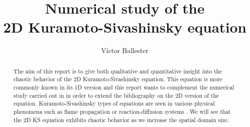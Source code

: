 \documentclass[twoside]{article}
\title{Numerical study of the\\2D Kuramoto-Sivashinsky equation}
\author{Víctor Ballester}
\date{\parbox{\linewidth}{\centering
Instabilities and Nonlinear Phenomena\endgraf
M2 - Applied and Theoretical Mathematics\endgraf
Université Paris-Dauphine, PSL\endgraf
\today}}
\begin{document}
\maketitle
\begin{abstract}
  The aim of this report is to give both qualitative and quantitative insight into the chaotic behavior of the 2D Kuramoto-Sivashinsky equation. This equation is more commonly known in its 1D version and this report wants to complement the numerical study carried out in \cite{Kalogirou2015} in order to extend the bibliography on the 2D version of the equation. Kuramoto-Sivashinsky types of equations are seen in various physical phenomena such as flame propagation or reaction-diffusion systems \cite{Kuramoto,Sivashinsky1977}. We will see that the 2D KS equation exhibits chaotic behavior as we increase the spatial domain size.
\end{abstract}
\end{document}
